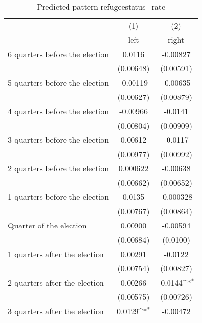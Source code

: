 \begin{table}[htbp]\centering
\def\sym#1{\ifmmode^{#1}\else\(^{#1}\)\fi}
\caption{Predicted pattern refugeestatus\_rate}
\begin{tabular}{l*{2}{c}}
\hline\hline
                    &\multicolumn{1}{c}{(1)}&\multicolumn{1}{c}{(2)}\\
                    &\multicolumn{1}{c}{left}&\multicolumn{1}{c}{right}\\
\hline
 6 quarters before the election&      0.0116         &    -0.00827         \\
                    &   (0.00648)         &   (0.00591)         \\
[1em]
 5 quarters before the election&    -0.00119         &    -0.00635         \\
                    &   (0.00627)         &   (0.00879)         \\
[1em]
 4 quarters before the election&    -0.00966         &     -0.0141         \\
                    &   (0.00804)         &   (0.00909)         \\
[1em]
 3 quarters before the election&     0.00612         &     -0.0117         \\
                    &   (0.00977)         &   (0.00992)         \\
[1em]
 2 quarters before the election&    0.000622         &    -0.00638         \\
                    &   (0.00662)         &   (0.00652)         \\
[1em]
 1 quarters before the election&      0.0135         &   -0.000328         \\
                    &   (0.00767)         &   (0.00864)         \\
[1em]
Quarter of the election&     0.00900         &    -0.00594         \\
                    &   (0.00684)         &    (0.0100)         \\
[1em]
 1 quarters after the election&     0.00291         &     -0.0122         \\
                    &   (0.00754)         &   (0.00827)         \\
[1em]
 2 quarters after the election&     0.00266         &     -0.0144\sym{*}  \\
                    &   (0.00575)         &   (0.00726)         \\
[1em]
 3 quarters after the election&      0.0129\sym{*}  &    -0.00472         \\

\end{tabular}
\end{table}
